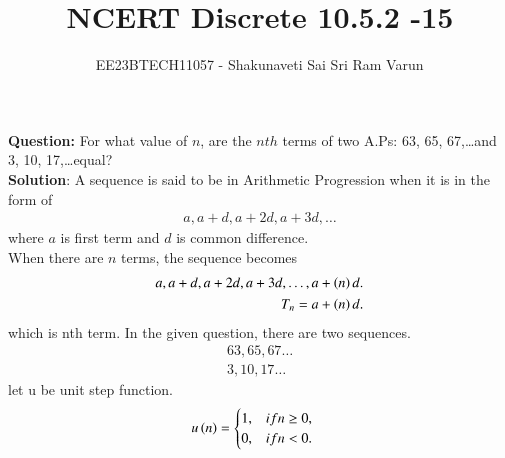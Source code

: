 \documentclass[journal,12pt,twocolumn]{IEEEtran}
\theoremstyle{remark}
\begin{document}

\vspace{3cm}

\title{NCERT Discrete 10.5.2 -15}
\author{EE23BTECH11057 - Shakunaveti Sai Sri Ram Varun$^{}$%
}
\maketitle
\newpage
\bigskip

\vspace{2cm}
\textbf{Question: }
For what value of $ n$, are the $ nth$ terms of two A.Ps: 63, 65, 67,\dots and 3, 10, 17,\dots equal?\\
\vspace{0.5cm}
\textbf{Solution}:
A sequence is said to be in Arithmetic Progression when it is in the form of
\begin{align}
a, a+d, a+2d, a+3d, \dots
\end{align}
where $a$ is first term and $d$ is common difference.\\
When there are $ n$ terms, the sequence becomes
\begin{align}
a, a+d, a+2d, a+3d,\dots, a+\left(n\right)d.\\
T_n = a+\left(n\right)d.
\end{align}
which is nth term.
In the given question, there are two sequences.
\begin{align}
63, 65, 67 \dots \label{eq:1}\\
3, 10, 17 \dots \label{eq:2}
\end{align}
let u be unit step function.\\
\begin{align}
u\left(n\right) &=
\begin{cases}
1, & if  n \geq 0, \\
0, & if  n < 0.
\end{cases}
\end{align}
\end{document}
